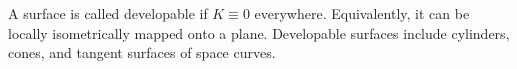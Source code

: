 A surface is called developable if $K \equiv 0$ everywhere. Equivalently, it can be locally isometrically mapped onto a plane. Developable surfaces include cylinders, cones, and tangent surfaces of space curves.